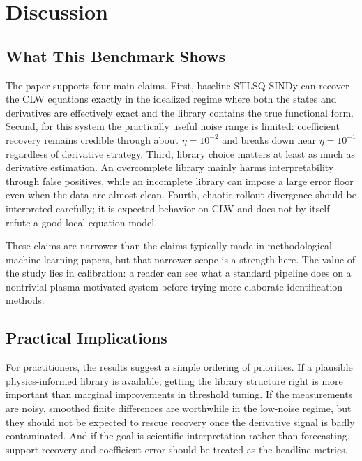 \documentclass[12pt]{article}
\begin{document}
\section{Discussion}
\label{sec:discussion}

\subsection{What This Benchmark Shows}

The paper supports four main claims.
First, baseline STLSQ-SINDy can recover the CLW equations exactly in the idealized regime where both the states and derivatives are effectively exact and the library contains the true functional form.
Second, for this system the practically useful noise range is limited: coefficient recovery remains credible through about $\eta = 10^{-2}$ and breaks down near $\eta = 10^{-1}$ regardless of derivative strategy.
Third, library choice matters at least as much as derivative estimation.
An overcomplete library mainly harms interpretability through false positives, while an incomplete library can impose a large error floor even when the data are almost clean.
Fourth, chaotic rollout divergence should be interpreted carefully; it is expected behavior on CLW and does not by itself refute a good local equation model.

These claims are narrower than the claims typically made in methodological machine-learning papers, but that narrower scope is a strength here.
The value of the study lies in calibration: a reader can see what a standard pipeline does on a nontrivial plasma-motivated system before trying more elaborate identification methods.

\subsection{Practical Implications}

For practitioners, the results suggest a simple ordering of priorities.
If a plausible physics-informed library is available, getting the library structure right is more important than marginal improvements in threshold tuning.
If the measurements are noisy, smoothed finite differences are worthwhile in the low-noise regime, but they should not be expected to rescue recovery once the derivative signal is badly contaminated.
And if the goal is scientific interpretation rather than forecasting, support recovery and coefficient error should be treated as the headline metrics.
\end{document}
